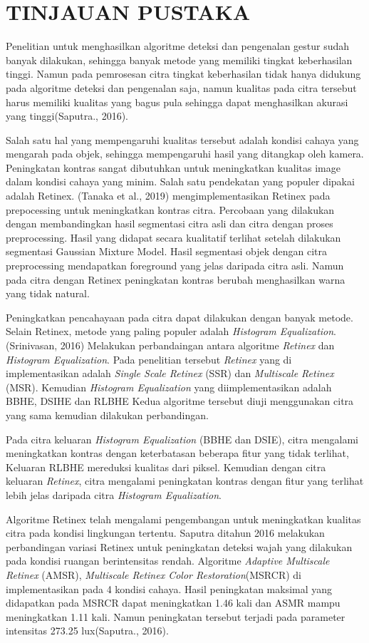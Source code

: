\chapter{TINJAUAN PUSTAKA} 
Penelitian untuk menghasilkan algoritme deteksi dan pengenalan gestur sudah banyak dilakukan, sehingga banyak metode yang memiliki tingkat keberhasilan tinggi. Namun pada pemrosesan citra tingkat keberhasilan tidak hanya didukung pada algoritme deteksi dan pengenalan saja, namun kualitas pada citra tersebut harus memiliki kualitas yang bagus pula sehingga dapat menghasilkan akurasi yang tinggi(Saputra., 2016).

Salah satu hal yang mempengaruhi kualitas tersebut adalah kondisi cahaya yang mengarah pada objek, sehingga mempengaruhi hasil yang ditangkap oleh kamera. Peningkatan kontras sangat dibutuhkan untuk meningkatkan kualitas image dalam kondisi cahaya yang minim. Salah satu pendekatan yang populer dipakai adalah Retinex. (Tanaka et al., 2019) mengimplementasikan Retinex pada prepocessing untuk meningkatkan kontras citra. Percobaan yang dilakukan dengan membandingkan hasil segmentasi citra asli dan citra dengan proses preprocessing. Hasil yang didapat secara kualitatif terlihat setelah dilakukan segmentasi Gaussian Mixture Model. Hasil segmentasi objek dengan citra preprocessing mendapatkan foreground yang jelas daripada citra asli. Namun pada citra dengan Retinex peningkatan kontras berubah menghasilkan warna yang tidak natural.

Peningkatkan pencahayaan pada citra dapat dilakukan dengan banyak metode. Selain Retinex, metode yang paling populer adalah \emph{Histogram Equalization}. (Srinivasan, 2016) Melakukan perbandaingan antara algoritme \emph{Retinex} dan \emph{Histogram Equalization}. Pada penelitian tersebut \emph{Retinex} yang di implementasikan adalah \emph{Single Scale Retinex} (SSR) dan \emph{Multiscale Retinex} (MSR). Kemudian \emph{Histogram Equalization} yang diimplementasikan adalah BBHE, DSIHE dan RLBHE Kedua algoritme tersebut diuji menggunakan citra yang sama kemudian dilakukan perbandingan. 

Pada citra keluaran \emph{Histogram Equalization} (BBHE dan DSIE), citra mengalami meningkatkan kontras dengan keterbatasan beberapa fitur yang tidak terlihat, Keluaran RLBHE mereduksi kualitas dari piksel. Kemudian dengan citra keluaran \emph{Retinex}, citra mengalami peningkatan kontras dengan fitur yang terlihat lebih jelas daripada citra \emph{Histogram Equalization}.

Algoritme Retinex telah mengalami pengembangan untuk meningkatkan kualitas citra pada kondisi lingkungan tertentu. Saputra ditahun 2016 melakukan perbandingan variasi Retinex untuk peningkatan deteksi wajah yang dilakukan pada kondisi ruangan berintensitas rendah. Algoritme \emph{Adaptive Multiscale Retinex} (AMSR), \emph{Multiscale Retinex Color Restoration}(MSRCR) di implementasikan pada 4 kondisi cahaya. Hasil peningkatan maksimal yang didapatkan pada MSRCR dapat meningkatkan 1.46 kali dan ASMR mampu meningkatkan 1.11 kali. Namun peningkatan tersebut terjadi pada parameter intensitas 273.25 lux(Saputra., 2016).

